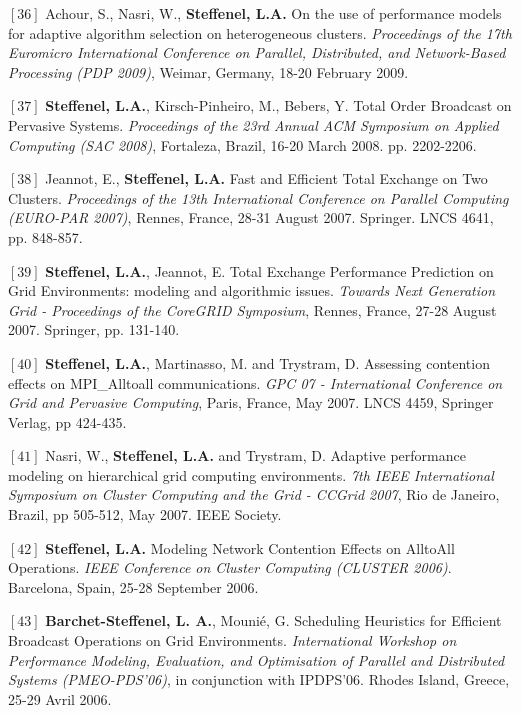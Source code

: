 \documentclass[final,twoside]{hdr} %
\begin{document}
\vspace{1em} \noindent $[36]$
Achour, S., Nasri, W., {\bf Steffenel, L.A.} {On the use of performance models for adaptive algorithm selection on heterogeneous clusters}. {\em Proceedings of the 17th Euromicro International Conference on Parallel, Distributed, and Network-Based Processing (PDP 2009)}, Weimar, Germany, 18-20 February 2009. 

\vspace{1em} \noindent $[37]$
{\bf Steffenel, L.A.}, Kirsch-Pinheiro, M., Bebers, Y. {Total Order Broadcast on Pervasive Systems}. {\em Proceedings of the 23rd Annual ACM Symposium on Applied Computing (SAC 2008)}, Fortaleza, Brazil, 16-20 March 2008. pp. 2202-2206. 

\vspace{1em} \noindent $[38]$
Jeannot, E., \textbf{Steffenel, L.A.} {Fast and Efficient Total Exchange on Two Clusters}. {\em Proceedings of the 13th International Conference on Parallel Computing (EURO-PAR 2007)}, Rennes, France, 28-31 August 2007. Springer. LNCS 4641, pp. 848-857. 

\vspace{1em} \noindent $[39]$
{\bf Steffenel, L.A.}, Jeannot, E. {Total Exchange Performance Prediction on Grid Environments: modeling and algorithmic issues}. {\em Towards Next Generation Grid - Proceedings of the CoreGRID Symposium}, Rennes, France, 27-28 August 2007. Springer, pp. 131-140.

\vspace{1em} \noindent $[40]$
{\bf Steffenel, L.A.}, Martinasso, M. and Trystram, D. {Assessing contention effects on MPI\_Alltoall communications}. {\em GPC 07 - International Conference on Grid and Pervasive Computing}, Paris, France, May 2007. LNCS 4459, Springer Verlag, pp 424-435.

\vspace{1em} \noindent $[41]$
Nasri, W., {\bf Steffenel, L.A.} and Trystram, D. {Adaptive performance modeling on hierarchical grid computing environments}. {\em 7th IEEE International Symposium on Cluster Computing and the Grid - CCGrid 2007}, Rio de Janeiro, Brazil, pp 505-512, May 2007. IEEE Society.

\vspace{1em} \noindent $[42]$
{\bf Steffenel, L.A.} {Modeling Network Contention Effects on AlltoAll Operations}. {\em IEEE Conference on Cluster Computing (CLUSTER 2006)}. Barcelona, Spain, 25-28 September 2006. 

\vspace{1em} \noindent $[43]$
\textbf{Barchet-Steffenel, L. A.}, Mounié, G. {Scheduling Heuristics for Efficient Broadcast Operations on Grid Environments}. {\em International Workshop on Performance Modeling, Evaluation, and Optimisation of Parallel and Distributed Systems (PMEO-PDS'06)}, in conjunction with IPDPS'06. Rhodes Island, Greece, 25-29 Avril 2006.
\end{document}
